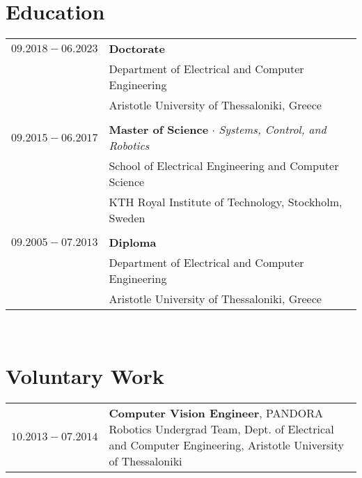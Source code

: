 \documentclass[a4paper,10pt,twoside]{article}
\begin{document}

\section{Education}

\begin{tabular}{rp{12cm}}
$09.2018 - 06.2023$ & \textbf{Doctorate} \\
                    & Department of Electrical and Computer Engineering\\
                    & Aristotle University of Thessaloniki, Greece \\
&\\
$09.2015 - 06.2017$ & \textbf{Master of Science} $\cdot$ \textit{Systems, Control, and Robotics}\\
                    & School of Electrical Engineering and Computer Science\\
                    & KTH Royal Institute of Technology, Stockholm, Sweden\\
&\\
$09.2005 - 07.2013$ & \textbf{Diploma}\\
                    & Department of Electrical and Computer Engineering\\
                    & Aristotle University of Thessaloniki, Greece \\
\end{tabular}\\


\section{Voluntary Work}

\begin{tabular}{rp{12cm}}
$10.2013 - 07.2014$ & \textbf{Computer Vision Engineer}, PANDORA Robotics Undergrad Team,
Dept. of Electrical and Computer Engineering, Aristotle University of Thessaloniki \\
\end{tabular} \\
\end{document}
